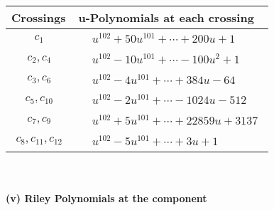 \documentclass[1p]{elsarticle_modified}
\theoremstyle{definition}
\begin{document}
\begin{tabular}{m{50pt}|m{274pt}}
Crossings & \hspace{64pt}u-Polynomials at each crossing \\
\hline $$\begin{aligned}c_{1}\end{aligned}$$&$\begin{aligned}
&u^{102}+50 u^{101}+\cdots+200 u+1
\end{aligned}$\\
\hline $$\begin{aligned}c_{2},c_{4}\end{aligned}$$&$\begin{aligned}
&u^{102}-10 u^{101}+\cdots-100 u^2+1
\end{aligned}$\\
\hline $$\begin{aligned}c_{3},c_{6}\end{aligned}$$&$\begin{aligned}
&u^{102}-4 u^{101}+\cdots+384 u-64
\end{aligned}$\\
\hline $$\begin{aligned}c_{5},c_{10}\end{aligned}$$&$\begin{aligned}
&u^{102}-2 u^{101}+\cdots-1024 u-512
\end{aligned}$\\
\hline $$\begin{aligned}c_{7},c_{9}\end{aligned}$$&$\begin{aligned}
&u^{102}+5 u^{101}+\cdots+22859 u+3137
\end{aligned}$\\
\hline $$\begin{aligned}c_{8},c_{11},c_{12}\end{aligned}$$&$\begin{aligned}
&u^{102}-5 u^{101}+\cdots+3 u+1
\end{aligned}$\\
\hline
\end{tabular}\\~\\
\newpage\renewcommand{\arraystretch}{1}
\flushleft \textbf{(v) Riley Polynomials at the component}\newline \\
\end{document}
